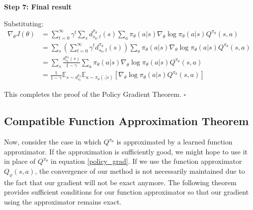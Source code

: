 \textbf{Step 7: Final result}

Substituting:
\begin{align}
\nabla_\theta J(\theta) &= \sum_{t=0}^{\infty} \gamma^t \sum_s d^{\pi_\theta}_{s_0,t}(s) \sum_a \pi_\theta(a|s) \nabla_\theta \log \pi_\theta(a|s) Q^{\pi_\theta}(s, a) \\
&= \sum_s \left( \sum_{t=0}^{\infty} \gamma^t d^{\pi_\theta}_{s_0,t}(s) \right) \sum_a \pi_\theta(a|s) \nabla_\theta \log \pi_\theta(a|s) Q^{\pi_\theta}(s, a) \\
&= \sum_s \frac{d^{\pi_\theta}_{s_0}(s)}{1-\gamma} \sum_a \pi_\theta(a|s) \nabla_\theta \log \pi_\theta(a|s) Q^{\pi_\theta}(s, a) \\
&= \frac{1}{1-\gamma} \mathbb{E}_{s \sim d^{\pi_\theta}_{s_0}} \mathbb{E}_{a \sim \pi_\theta(.|s)} \left[ \nabla_\theta \log \pi_\theta(a|s) Q^{\pi_\theta}(s, a) \right]
\end{align}

This completes the proof of the Policy Gradient Theorem. $\square$


\subsection{Compatible Function Approximation Theorem}

Now, consider the case in which $Q^{\pi_\theta}$ is approximated by a learned function approximator. If the approximation is sufficiently good, we might hope to use it in place of $Q^{\pi_\theta}$ in equation \ref{policy_grad}. If we use the function approximator $Q_{\phi}(s, a)$, the convergence of our method is not necessarily maintained due to the fact that our gradient will not be exact anymore. The following theorem provides sufficient conditions for our function approximator so that our gradient using the approximator remains exact.

